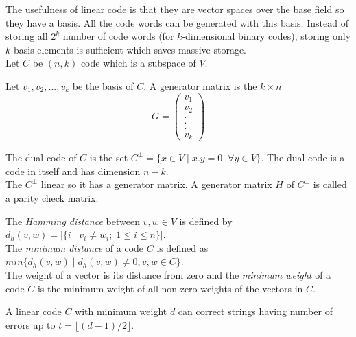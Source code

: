 The usefulness of linear code is that they are vector spaces over the base field so they have a basis. All the code words can be generated with this basis. Instead of storing all \(2^k\) number of code words (for \(k\)-dimensional binary codes), storing only \(k\) basis elements is sufficient which saves massive storage.\\[2mm]
Let \(C\) be \((n,k)\) code which is a subspace of \(V\).

\begin{definition}
     Let \(v_1, v_2,...,v_k\) be the basis of \(C\). A generator matrix is the \(k \times n\)
    \[G=\begin{pmatrix}
        v_1\\
        v_2\\
        .\\
        .\\
        .\\
        v_k
        \end{pmatrix}
\]
\end{definition}
\vspace{2mm}

\begin{definition}
    The dual code of \(C\) is the set \(C^{\perp}=\{x \in V \;| \; x.y=0 \;\; \forall y \in V \}\). The dual code is a code in itself and has dimension \(n-k\).\\
    The \(C^{\perp}\) linear so it has a generator matrix. A generator matrix \(H\) of \(C^{\perp}\) is called a parity check matrix. 
\end{definition}

\begin{definition}
    The \textit{Hamming distance} between \(v,w \in V\) is defined by \(d_h(v,w)=|\{i\;|\; v_i \neq w_i;\; 1 \leq i \leq n \}|\).\\
    The \textit{minimum distance} of a code \(C\) is defined as \(min\{d_h(v,w)\;|\; d_h(v,w) \neq 0, v,w \in C\}\).\\
    The weight of a vector is its distance from zero and the \textit{minimum weight} of a code \(C\) is the minimum weight of all non-zero weights of the vectors in \(C\).
\end{definition}

\begin{theorem}
A linear code \(C\) with minimum weight \(d\) can correct strings having number of errors up to \(t= \lfloor (d-1)/2 \rfloor\).
\end{theorem}

